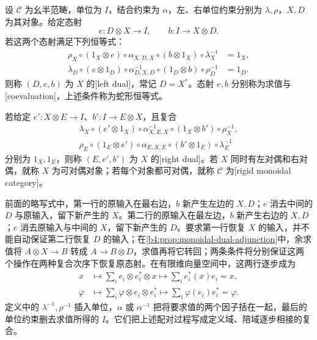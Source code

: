 \begin{definition}\label{b4:def:monoidal-dual}
	设 \(\mathcal C\) 为幺半范畴，单位为 \(I\)，结合约束为 \(\alpha\)，左、右单位约束分别为 \(\lambda,\rho\)，\(X,D\) 为其对象。给定态射
	\[
		e:D\otimes X\longrightarrow I, \qquad b:I\longrightarrow X\otimes D.
	\]
	若这两个态射满足下列恒等式：
	\begin{equation}\label{b4:eq:monoidal-left-snakes}
		\begin{aligned}
			\rho_X\circ(1_X\otimes e)\circ\alpha_{X,D,X} \circ(b\otimes1_X)\circ\lambda_X^{-1}&=1_X,\\
			\lambda_D\circ(e\otimes1_D)\circ\alpha_{D,X,D}^{-1} \circ(1_D\otimes b)\circ\rho_D^{-1}&=1_D.
		\end{aligned}
	\end{equation}
	则称 \((D,e,b)\) 为 \(X\) 的[left dual]，常记 \(D=X^*\)。态射 \(e,b\) 分别称为求值与[coevaluation]，上述条件称为蛇形恒等式。

	若给定 \(e':X\otimes E\to I\)、\(b':I\to E\otimes X\)，且复合
	\[
		\begin{gathered}
			\lambda_X\circ(e'\otimes1_X)\circ\alpha_{X,E,X}^{-1} \circ(1_X\otimes b')\circ\rho_X^{-1},\\
			\rho_E\circ(1_E\otimes e')\circ\alpha_{E,X,E} \circ(b'\otimes1_E)\circ\lambda_E^{-1}
		\end{gathered}
	\]
	分别为 \(1_X,1_E\)，则称 \((E,e',b')\) 为 \(X\) 的[right dual]。若 \(X\) 同时有左对偶和右对偶，就称 \(X\) 为可对偶对象；若每个对象都可对偶，就称 \(\mathcal C\) 为[rigid monoidal category]。
\end{definition}

前面的略写式中，第一行的原输入在最右边，\(b\) 新产生左边的 \(X,D\)；\(e\) 消去中间的 \(D\) 与原输入，留下新产生的 \(X\)。第二行的原输入在最左边，\(b\) 新产生右边的 \(X,D\)；\(e\) 消去原输入与中间的 \(X\)，留下新产生的 \(D\)。要求第一行恢复 \(X\) 的输入，并不能自动保证第二行恢复 \(D\) 的输入；在\cref{b4:prop:monoidal-dual-adjunction}中，余求值将 \(A\otimes X\to B\) 转成 \(A\to B\otimes D\)，求值再将它转回；两条条件将分别保证这两个操作在两种复合次序下恢复原态射。在有限维向量空间中，这两行逐步成为
\[
	\begin{aligned}
		x&\longmapsto\sum_i e_i\otimes e_i^*\otimes x \longmapsto\sum_i e_i^*(x)e_i=x,\\
		\varphi&\longmapsto\sum_i\varphi\otimes e_i\otimes e_i^* \longmapsto\sum_i\varphi(e_i)e_i^*=\varphi.
	\end{aligned}
\]
定义中的 \(\lambda^{-1},\rho^{-1}\) 插入单位，\(\alpha\) 或 \(\alpha^{-1}\) 把将要求值的两个因子括在一起，最后的单位约束删去求值所得的 \(I\)。它们把上述配对过程写成定义域、陪域逐步相接的复合。

